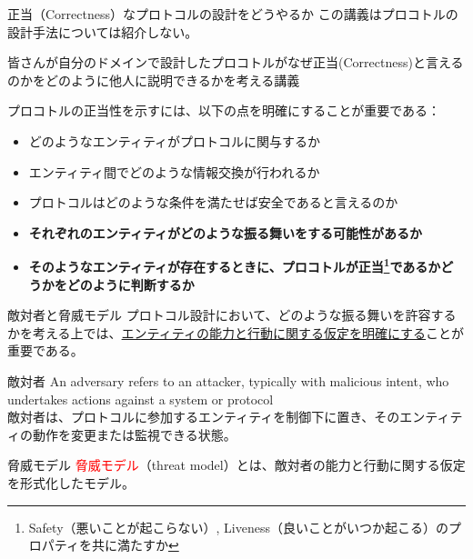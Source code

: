 \documentclass[aspectratio=169,10pt]{beamer}
\newenvironment{proofblock}[1][]
{\begin{block}{#1}\vspace{0.5em}}
{\vspace{0.5em}\end{block}}
\newenvironment{outlineblock}[1][]
{\begin{tcolorbox}[colframe=black, colback=white, boxrule=1pt, boxsep=5pt]}
{\end{tcolorbox}}
\begin{document}
\begin{frame}{正当（Correctness）なプロトコルの設計をどうやるか}
この講義はプロコトルの設計手法については紹介しない。

\begin{outlineblock}[]
    皆さんが自分のドメインで設計したプロコトルがなぜ正当(Correctness)と言えるのかをどのように他人に説明できるかを考える講義
\end{outlineblock}

プロコトルの正当性を示すには、以下の点を明確にすることが重要である：
\begin{itemize}
    \item どのようなエンティティがプロトコルに関与するか
    \item エンティティ間でどのような情報交換が行われるか
    \item プロトコルはどのような条件を満たせば安全であると言えるのか
    \item \textbf{それぞれのエンティティがどのような振る舞いをする可能性があるか}
    \item \textbf{そのようなエンティティが存在するときに、プロコトルが正当\footnote{Safety（悪いことが起こらない）, Liveness（良いことがいつか起こる）のプロパティを共に満たすか}であるかどうかをどのように判断するか}
\end{itemize}

\end{frame}


\begin{frame}{敵対者と脅威モデル}
プロトコル設計において、どのような振る舞いを許容するかを考える上では、\underline{エンティティの能力と行動に関する仮定を明確にする}ことが重要である。

\begin{proofblock}[敵対者]
An adversary refers to an attacker, typically with malicious intent, who undertakes actions against a system or protocol\\
敵対者は、プロトコルに参加するエンティティを制御下に置き、そのエンティティの動作を変更または監視できる状態。
\end{proofblock}

\vspace{0.5em}
\begin{proofblock}[脅威モデル]
\textcolor{red}{脅威モデル}（threat model）とは、敵対者の能力と行動に関する仮定を形式化したモデル。
\end{proofblock}

\end{frame}
\end{document}
